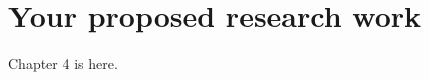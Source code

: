 \documentclass[../main/thesis.tex]{subfiles}
\begin{document}
\chapter{Your proposed research work}
\label{ch:4}
Chapter 4 is here.

\bib
\end{document}
